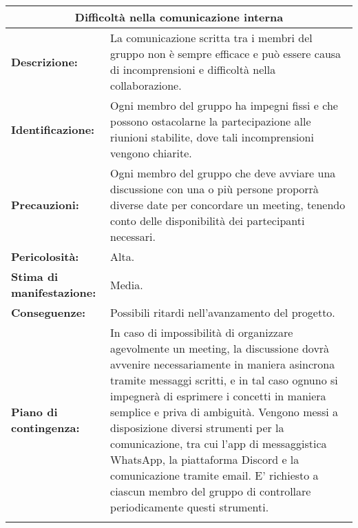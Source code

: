 \renewcommand\tabularxcolumn[1]{>{\Centering}m{#1}}
\begin{tabularx}{\textwidth}{ |X|X|}
\hline
\multicolumn{2}{|c|}{\textbf{Difficoltà nella comunicazione interna}} \\
\hline
\textbf{Descrizione:}& La comunicazione scritta tra i membri del gruppo non è sempre efficace e può essere causa di incomprensioni e difficoltà nella collaborazione. \\
\hline
\textbf{Identificazione:}& Ogni membro del gruppo ha impegni fissi e 
 che possono ostacolarne la partecipazione alle riunioni stabilite, dove 
tali incomprensioni vengono chiarite. \\
\hline
\textbf{Precauzioni:}& Ogni membro del gruppo che deve avviare una discussione con una o più persone proporrà diverse date per concordare un meeting, tenendo conto delle disponibilità dei partecipanti necessari. \\
\hline
\textbf{Pericolosità:}& Alta.\\
\hline
\textbf{Stima di manifestazione:}& Media.\\
\hline
\textbf{Conseguenze:}& Possibili ritardi nell'avanzamento del progetto.\\
\hline
\textbf{Piano di contingenza:}& In caso di impossibilità di organizzare agevolmente un meeting, la discussione dovrà avvenire necessariamente in maniera asincrona tramite messaggi scritti, e in tal caso ognuno si impegnerà di esprimere i concetti in maniera semplice e priva di ambiguità. Vengono messi a disposizione diversi strumenti per la comunicazione, tra cui l'app di messaggistica WhatsApp, la piattaforma Discord e la comunicazione tramite email. E' richiesto a ciascun membro del gruppo di controllare periodicamente questi strumenti. \\
\hline
\caption{Difficoltà nella comunicazione interna}
\end{tabularx}

